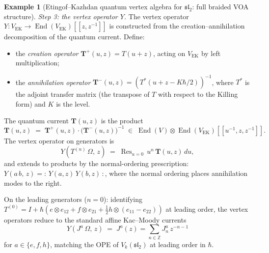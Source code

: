 \documentclass[11pt,reqno]{amsart}
\theoremstyle{definition}
\newtheorem{example}[theorem]{Example}
\theoremstyle{remark}
\DeclareMathOperator{\Res}{Res}
\DeclareMathOperator{\End}{End}
\newcommand{\ZZ}{\mathbb{Z}}
\numberwithin{equation}{section}
\begin{document}
\begin{example}[Etingof--Kazhdan quantum vertex algebra for
$\mathfrak{sl}_2$: full braided VOA structure]
\smallskip
\noindent\emph{Step 3: the vertex operator $Y$.}
The vertex operator
$Y \colon V_{\mathrm{EK}} \to \End(V_{\mathrm{EK}})[\![z, z^{-1}]\!]$
is constructed from the creation--annihilation decomposition
of the quantum current. Define:
\begin{itemize}
\item the \emph{creation operator}
  $\mathbf{T}^+(u, z) = T(u + z)$, acting on
  $V_{\mathrm{EK}}$ by left multiplication;
\item the \emph{annihilation operator}
  $\mathbf{T}^-(u, z) = (T^*(u + z - K\hbar/2))^{-1}$,
  where $T^*$ is the adjoint transfer matrix
  (the transpose of $T$ with respect to the Killing form)
  and $K$ is the level.
\end{itemize}
The quantum current $\mathbf{T}(u, z)$ is the product
\begin{equation}\label{eq:ek-current}
  \mathbf{T}(u, z)
  \;=\;
  \mathbf{T}^+(u, z) \cdot
  \bigl(\mathbf{T}^-(u, z)\bigr)^{-1}
  \;\in\;
  \End(V) \otimes \End(V_{\mathrm{EK}})[\![u^{-1}, z, z^{-1}]\!].
\end{equation}
The vertex operator on generators is
\begin{equation}\label{eq:ek-vertex-gen}
  Y(T^{(n)}\,\Omega,\, z)
  \;=\;
  \Res_{u=0}\, u^n\, \mathbf{T}(u, z)\, du,
\end{equation}
and extends to products by the normal-ordering prescription:
$Y(a\,b,\,z) = {:}\,Y(a,z)\,Y(b,z)\,{:}$, where the
normal ordering places annihilation modes to the right.

On the leading generators ($n = 0$): identifying
$T^{(0)} = I + \hbar(e \otimes e_{12} + f \otimes e_{21}
+ \tfrac{1}{2}h \otimes (e_{11} - e_{22}))$ at leading
order, the vertex operators reduce to the standard affine
Kac--Moody currents
\begin{equation}\label{eq:ek-vertex-leading}
  Y(J^a\,\Omega,\, z)
  \;=\;
  J^a(z) = \sum_{n \in \ZZ} J^a_n\, z^{-n-1}
\end{equation}
for $a \in \{e, f, h\}$, matching the OPE of
$V_k(\mathfrak{sl}_2)$ at leading order in $\hbar$.


\end{example}
\end{document}

